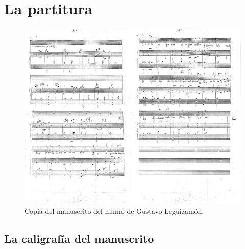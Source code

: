\chapter{La partitura}
\label{cap:partitura}

\begin{figure}[H]
\centering
\includegraphics[width=1.0\textwidth]{img/partitura-original}
\caption{Copia del manuscrito del himno de Gustavo Leguizamón.}
\label{fig:partitura}
\end{figure}

\section{La caligrafía del manuscrito}
\label{sec:caligrafia}


